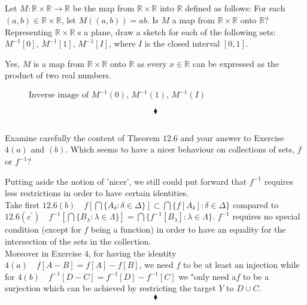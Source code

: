 \subsection{}
\begin{tcolorbox}
Let $M:\mathbb{R}\times\mathbb{R}\rightarrow \mathbb{R}$ be the map from $\mathbb{R}\times\mathbb{R}$ into $\mathbb{R}$ defined as follows: For each $(a,b)\in \mathbb{R}\times\mathbb{R}$, let $M\left((a,b)\right)=ab$. Is $M$ a map from $\mathbb{R}\times\mathbb{R}$ onto $\mathbb{R}$? Representing $\mathbb{R}\times\mathbb{R}$ s a plane, draw a sketch for each of the following sets: $M^{-1}[0],\,M^{-1}[1],\, M^{-1}[I]$, where $I$ is the closed interval $[0,1]$. 
\end{tcolorbox}
Yes, $M$ is a map from $\mathbb{R}\times\mathbb{R}$ onto $\mathbb{R}$ as every $x\in\mathbb{R}$ can be expressed as the product of two real numbers.
\begin{figure}[H]%
    \centering
    
\caption{$\text{Inverse image of } M^{-1}(0),\,M^{-1}(1),\, M^{-1}(I)$}
\label{fig:fig_p8b}
\end{figure}
$$\blacklozenge$$

\subsection{}
\begin{tcolorbox}
Examine carefully the content of Theorem $\mathbf{12.6}$ and your answer to Exercise $4(a)$ and $(b)$. Which seems to have a nicer behaviour on collections of sets, $f$ or $f^{-1}$?
\end{tcolorbox}
Putting aside the notion of 'nicer', we still could put forward that $f^{-1}$ requires less restrictions in order to have certain identities. \\
Take first $\mathbf{12.6}(b)\quad f\left[\bigcap\{A_{\delta}:\delta \in \Delta\}\right]\subset \bigcap\{f[A_{\delta}]:\delta \in \Delta\}$ compared to $\mathbf{12.6}(c^{'})\quad f^{-1}\left[\bigcap\{B_{\lambda}:\lambda \in \Lambda\}\right]= \bigcap\{f^{-1}[B_{\lambda}]:\lambda \in \Lambda\}$. $f^{-1}$ requires no special condition (except for $f$ being a function) in order to have an equality for the intersection of the sets in the collection.\\
Moreover in Exercise $4$, for having the identity $4(a)\quad f[A-B] = f[A]-f[B]$, we need $f$ to be at least an injection while for $4(b)\quad f^{-1}[D-C] = f^{-1}[D]-f^{-1}[C]$ we "only need a$f$ to be a surjection which can be achieved by  restricting the target $Y$ to $D\cup C$.
$$\blacklozenge$$
\newpage

